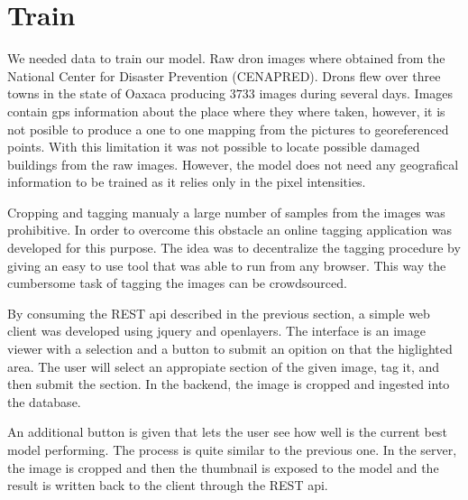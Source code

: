 \section{Train}

We needed data to train our model. Raw dron images where obtained from the National Center for Disaster Prevention (CENAPRED). Drons flew over three towns in the state of Oaxaca producing $3733$ images during several days. Images contain gps information about the place where they where taken, however, it is not posible to produce a one to one mapping from the pictures to georeferenced points. With this limitation it was not possible to locate possible damaged buildings from the raw images. However, the model does not need any geografical information to be trained as it relies only in the pixel intensities.

Cropping and tagging manualy a large number of samples from the images was prohibitive. In order to overcome this obstacle an online tagging application was developed for this purpose. The idea was to decentralize the tagging procedure by giving an easy to use tool that was able to run from any browser. This way the cumbersome task of tagging the images can be crowdsourced.

By consuming the REST api described in the previous section, a simple web client was developed using jquery and openlayers. The interface is an image viewer with a selection and a button to submit an opition on that the higlighted area. The user will select an appropiate section of the given image, tag it, and then submit the section. In the backend, the image is cropped and ingested into the database.

\begin{figure}[h]
  \begin{center}
  \end{center}
\end{figure}

An additional button is given that lets the user see how well is the current best model performing. The process is quite similar to the previous one. In the server, the image is cropped and then the thumbnail is exposed to the model and the result is written back to the client through the REST api.

\begin{figure}[h]
  \begin{center}
  \end{center}
\end{figure}


